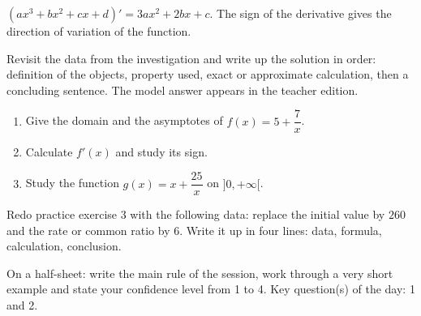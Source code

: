 \begin{traceecrite}$(ax^3+bx^2+cx+d)'=3ax^2+2bx+c$. The sign of the derivative gives the direction of variation of the function.\end{traceecrite}

\begin{exemple}
Revisit the data from the investigation and write up the solution in order: definition of the objects, property used, exact or approximate calculation, then a concluding sentence. The model answer appears in the teacher edition.
\end{exemple}
\enseignant{$f'(x)=6x^2-6x-12=6(x-2)(x+1)$. The function increases on $]-\infty,-1]$, decreases on $[-1,2]$, then increases.}

\begin{exercice}[-- essential]
\begin{enumerate}\item Give the domain and the asymptotes of $f(x)=5+\dfrac{7}x$.\item Calculate $f'(x)$ and study its sign.\item Study the function $g(x)=x+\dfrac{25}x$ on $]0,+\infty[$.\end{enumerate}
\end{exercice}


\begin{dm}Redo practice exercise 3 with the following data: replace the initial value by $260$ and the rate or common ratio by $6$. Write it up in four lines: data, formula, calculation, conclusion.\end{dm}

\begin{sortie}On a half-sheet: write the main rule of the session, work through a very short example and state your confidence level from 1 to 4. Key question(s) of the day: 1 and 2.\end{sortie}

